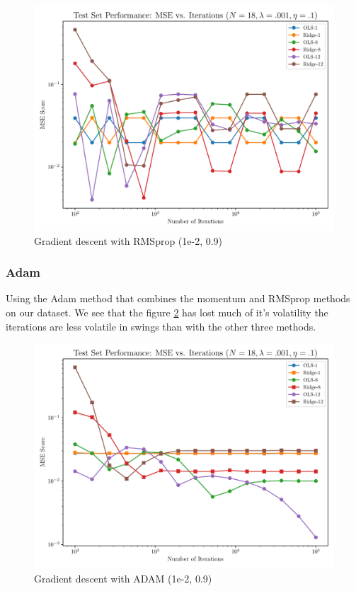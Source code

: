 \documentclass[amssymb,twocolumn,aps]{revtex4}
\begin{document}
\begin{figure}[h]
    \centering
    \includegraphics[width=.95 \linewidth]{Figures/OLS_Ridge_RMSprop.pdf}
    \caption{Gradient descent with RMSprop (1e-2, 0.9)}
    \label{fig:GradRMSprop}
\end{figure}

\subsubsection{Adam}

Using the Adam method that combines the momentum and RMSprop methods on our dataset.
We see that the figure \ref{fig:GradADAM} has lost much of it's volatility the iterations are less volatile in swings than with the other three methods.
\\

\begin{figure}[h]
    \centering
    \includegraphics[width=.95 \linewidth]{Figures/OLS_Ridge_ADAM.pdf}
    \caption{Gradient descent with ADAM (1e-2, 0.9)}
    \label{fig:GradADAM}
\end{figure}
\end{document}
